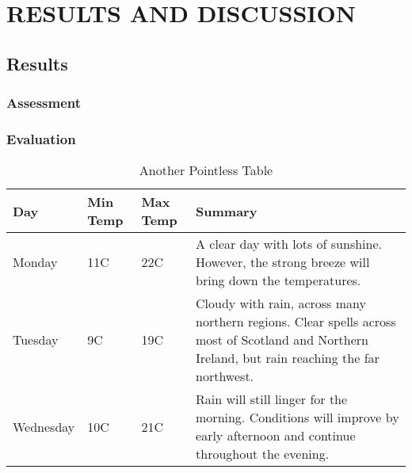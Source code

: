 
\chapter{RESULTS AND DISCUSSION} %

\section{Results}
\lipsum[1]
\subsection{Assessment}
\lipsum[2-4]
\subsection{Evaluation}
\lipsum[5]
\begin{table}
\centering
    \begin{tabular}{ | l | l | l | p{6cm} |}
    \hline
    Day & Min Temp & Max Temp & Summary \\ \hline
    Monday & 11C & 22C & A clear day with lots of sunshine.  
    However, the strong breeze will bring down the temperatures. \\ \hline
    Tuesday & 9C & 19C & Cloudy with rain, across many northern regions. Clear spells
    across most of Scotland and Northern Ireland,
    but rain reaching the far northwest. \\ \hline
    Wednesday & 10C & 21C & Rain will still linger for the morning.
    Conditions will improve by early afternoon and continue
    throughout the evening. \\
    \hline
    \end{tabular}
\caption{Another Pointless Table}
\label{APT}
\end{table}
\lipsum[5]

